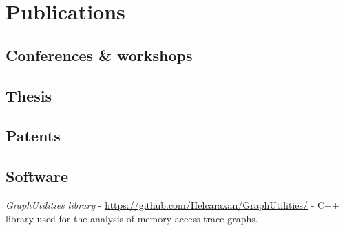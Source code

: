 \section{Publications}
\nocite{*}
\vspace*{-0.3cm}
\renewcommand*{\bibfont}{\footnotesize}
\subsection{Conferences \& workshops}
\vspace*{-0.4cm}
\hfill
\parbox{0.83\textwidth}{%
	\printbibliography[heading=none,type=inproceedings]
}

\subsection{Thesis}
\vspace*{-0.4cm}
\hfill
\parbox{0.83\textwidth}{%
	\printbibliography[heading=none,type=thesis]
}

\subsection{Patents}
\vspace*{-0.4cm}
\hfill
\parbox{0.83\textwidth}{%
	\printbibliography[heading=none,type=misc]
}

\subsection{Software}
\vspace*{-0.1cm}
\hfill
\parbox{0.83\textwidth}{%
	\footnotesize
	\textit{GraphUtilities library} - \url{https://github.com/Helcaraxan/GraphUtilities/} - C++ library
	used for the analysis of memory access trace graphs.
}

\vfill
